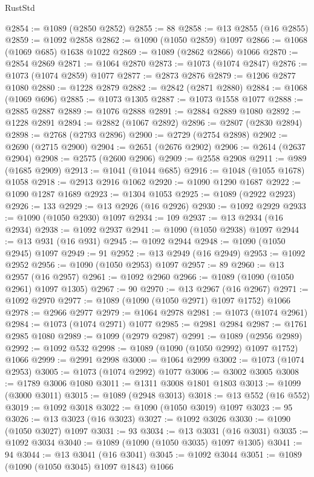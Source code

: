 \begin{lexlean}{RustStd}
\begin{coremodule}
@2854 := @1089 (@2850 @2852)
@2855 := 88
@2858 := @13 @2855 (@16 @2855)
@2859 := @1092 @2858
@2862 := @1090 (@1050 @2859) @1097
@2866 := @1068 (@1069 @685) @1638 @1022
@2869 := @1089 (@2862 @2866) @1066
@2870 := @2854 @2869
@2871 := @1064 @2870
@2873 := @1073 (@1074 @2847)
@2876 := @1073 (@1074 @2859) @1077
@2877 := @2873 @2876
@2879 := @1206 @2877 @1080
@2880 := @1228 @2879
@2882 := @2842 (@2871 @2880)
@2884 := @1068 (@1069 @696)
@2885 := @1073 @1305
@2887 := @1073 @1558 @1077
@2888 := @2885 @2887
@2889 := @1076 @2888
@2891 := @2884 @2889 @1080
@2892 := @1228 @2891
@2894 := @2882 (@1067 @2892)
@2896 := @2807 (@2830 @2894)
@2898 := @2768 (@2793 @2896)
@2900 := @2729 (@2754 @2898)
@2902 := @2690 (@2715 @2900)
@2904 := @2651 (@2676 @2902)
@2906 := @2614 (@2637 @2904)
@2908 := @2575 (@2600 @2906)
@2909 := @2558 @2908
@2911 := @989 (@1685 @2909)
@2913 := @1041 (@1044 @685)
@2916 := @1048 (@1055 @1678) @1058
@2918 := @2913 @2916 @1062
@2920 := @1090 @1290 @1687
@2922 := @1090 @1287 @1689
@2923 := @1304 @1053
@2925 := @1089 (@2922 @2923)
@2926 := 133
@2929 := @13 @2926 (@16 @2926)
@2930 := @1092 @2929
@2933 := @1090 (@1050 @2930) @1097
@2934 := 109
@2937 := @13 @2934 (@16 @2934)
@2938 := @1092 @2937
@2941 := @1090 (@1050 @2938) @1097
@2944 := @13 @931 (@16 @931)
@2945 := @1092 @2944
@2948 := @1090 (@1050 @2945) @1097
@2949 := 91
@2952 := @13 @2949 (@16 @2949)
@2953 := @1092 @2952
@2956 := @1090 (@1050 @2953) @1097
@2957 := 89
@2960 := @13 @2957 (@16 @2957)
@2961 := @1092 @2960
@2966 := @1089 (@1090 (@1050 @2961) @1097 @1305)
@2967 := 90
@2970 := @13 @2967 (@16 @2967)
@2971 := @1092 @2970
@2977 := @1089 (@1090 (@1050 @2971) @1097 @1752) @1066
@2978 := @2966 @2977
@2979 := @1064 @2978
@2981 := @1073 (@1074 @2961)
@2984 := @1073 (@1074 @2971) @1077
@2985 := @2981 @2984
@2987 := @1761 @2985 @1080
@2989 := @1099 (@2979 @2987)
@2991 := @1089 (@2956 @2989)
@2992 := @1092 @532
@2998 := @1089 (@1090 (@1050 @2992) @1097 @1752) @1066
@2999 := @2991 @2998
@3000 := @1064 @2999
@3002 := @1073 (@1074 @2953)
@3005 := @1073 (@1074 @2992) @1077
@3006 := @3002 @3005
@3008 := @1789 @3006 @1080
@3011 := @1311 @3008 @1801 @1803
@3013 := @1099 (@3000 @3011)
@3015 := @1089 (@2948 @3013)
@3018 := @13 @552 (@16 @552)
@3019 := @1092 @3018
@3022 := @1090 (@1050 @3019) @1097
@3023 := 95
@3026 := @13 @3023 (@16 @3023)
@3027 := @1092 @3026
@3030 := @1090 (@1050 @3027) @1097
@3031 := 93
@3034 := @13 @3031 (@16 @3031)
@3035 := @1092 @3034
@3040 := @1089 (@1090 (@1050 @3035) @1097 @1305)
@3041 := 94
@3044 := @13 @3041 (@16 @3041)
@3045 := @1092 @3044
@3051 := @1089 (@1090 (@1050 @3045) @1097 @1843) @1066

\end{coremodule}
\end{lexlean}
